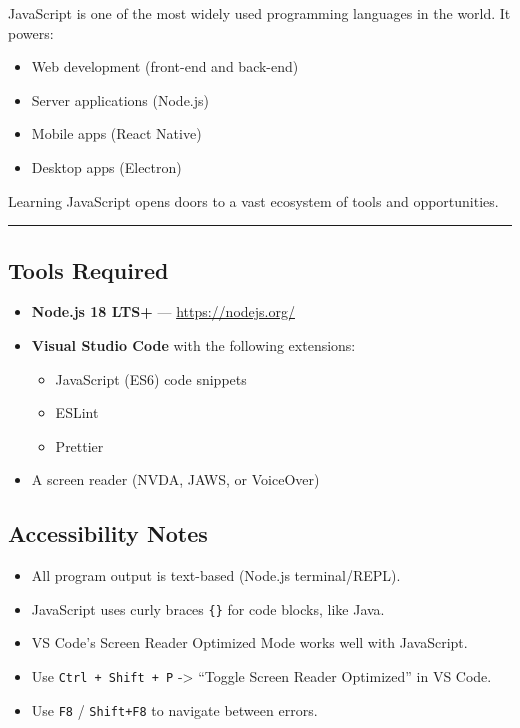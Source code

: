 \documentclass[
  justified,
  openright,
]{tufte-book}
\providecommand{\tightlist}{%
  \setlength{\itemsep}{0pt}\setlength{\parskip}{0pt}}
\begin{document}
JavaScript is one of the most widely used programming languages in the
world. It powers:

\begin{itemize}
\tightlist
\item
  Web development (front-end and back-end)
\item
  Server applications (Node.js)
\item
  Mobile apps (React Native)
\item
  Desktop apps (Electron)
\end{itemize}

Learning JavaScript opens doors to a vast ecosystem of tools and
opportunities.

\begin{center}\rule{0.5\linewidth}{0.5pt}\end{center}

\subsection{Tools Required}\label{tools-required}

\begin{itemize}
\tightlist
\item
  \textbf{Node.js 18 LTS+} --- \url{https://nodejs.org/}
\item
  \textbf{Visual Studio Code} with the following extensions:

  \begin{itemize}
  \tightlist
  \item
    JavaScript (ES6) code snippets
  \item
    ESLint
  \item
    Prettier
  \end{itemize}
\item
  A screen reader (NVDA, JAWS, or VoiceOver)
\end{itemize}

\subsection{Accessibility Notes}\label{accessibility-notes}

\begin{itemize}
\tightlist
\item
  All program output is text-based (Node.js terminal/REPL).
\item
  JavaScript uses curly braces \texttt{\{\}} for code blocks, like Java.
\item
  VS Code's Screen Reader Optimized Mode works well with JavaScript.
\item
  Use \texttt{Ctrl\ +\ Shift\ +\ P} -\textgreater{} ``Toggle Screen
  Reader Optimized'' in VS Code.
\item
  Use \texttt{F8} / \texttt{Shift+F8} to navigate between errors.
\end{itemize}
\end{document}
